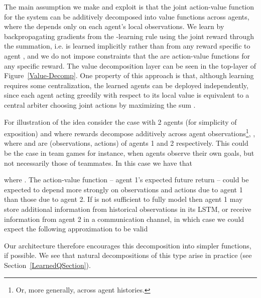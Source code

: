 \documentclass{article}
\begin{document}
\begin{SCfigure}
\iffalse
\begin{figure*}[htp]
  \centering
  \subfigure[Independent Agents Architecture]{\texttt{[image: \{pg\_0002]}}\quad
  \subfigure[Value-Decomposition Individual Architecture]{\texttt{[image: \{decomposed\_cropped]}}
\end{figure*}
\fi










The main assumption we make and exploit is that the joint action-value function for the system can be additively decomposed into value functions across agents,
where the  depends only on each agent's local observations. We learn  by backpropagating gradients from the -learning rule using the joint reward through the summation, i.e.  is learned implicitly rather than from any reward specific to agent , and we do not impose constraints that the  are action-value functions for any specific reward. The value decomposition layer can be seen in the top-layer of Figure~\ref{Value-Decomp}. One property of this approach is that, although learning requires some centralization, the learned agents can be deployed independently, since each agent acting greedily with respect to its local value  is equivalent to a central arbiter choosing joint actions by maximizing the sum .




For illustration of the idea consider the case with 2 agents (for simplicity of exposition) and where rewards decompose additively across agent observations\footnote{Or, more generally, across agent histories.}, , where  and  are (observations, actions) of agents 1 and 2 respectively. This could be the case in team games for instance, when agents observe their own goals, but not necessarily those of teammates. In this case we have that
  
where . 
The action-value function  -- agent 1's expected future return -- could be expected to depend more strongly on observations and actions  due to agent 1 than those due to agent 2. If  is not sufficient to fully model  then agent 1 may store additional information from historical observations in its LSTM, or receive information from agent 2 in a communication channel, in which case we could expect the following approximation to be valid

Our architecture therefore encourages this decomposition into simpler functions, if possible. We see that natural decompositions of this type arise in practice (see Section~\ref{LearnedQSection}).




\end{SCfigure}
\end{document}
